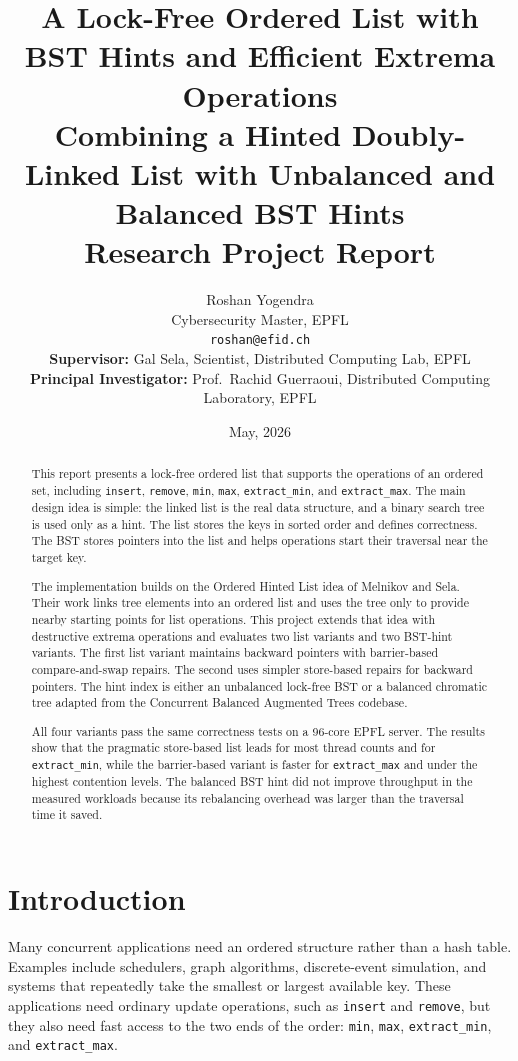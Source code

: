 \documentclass[a4paper,11pt]{article}
\title{\vspace{-1.0cm}\textbf{A Lock-Free Ordered List with BST Hints and Efficient Extrema Operations}\\[0.35em]
\large Combining a Hinted Doubly-Linked List with Unbalanced and Balanced BST Hints\\[0.35em]
\normalsize Research Project Report}
\author{
  Roshan Yogendra\\
  \small Cybersecurity Master, EPFL\\
  \small \texttt{roshan@efid.ch}\\[0.8em]
  \small \textbf{Supervisor:} Gal Sela, Scientist, Distributed Computing Lab, EPFL\\[0.3em]
  \small \textbf{Principal Investigator:} Prof.\ Rachid Guerraoui,
         Distributed Computing Laboratory, EPFL\\[0.8em]
}
\date{May, 2026}
\newcommand{\code}[1]{\texttt{#1}}
\begin{document}
\maketitle

\begin{abstract}
This report presents a lock-free ordered list that supports the operations of an ordered set, including \code{insert}, \code{remove}, \code{min}, \code{max}, \code{extract\_min}, and \code{extract\_max}. The main design idea is simple: the linked list is the real data structure, and a binary search tree is used only as a hint. The list stores the keys in sorted order and defines correctness. The BST stores pointers into the list and helps operations start their traversal near the target key.

The implementation builds on the Ordered Hinted List idea of Melnikov and Sela. Their work links tree elements into an ordered list and uses the tree only to provide nearby starting points for list operations. This project extends that idea with destructive extrema operations and evaluates two list variants and two BST-hint variants. The first list variant maintains backward pointers with barrier-based compare-and-swap repairs. The second uses simpler store-based repairs for backward pointers. The hint index is either an unbalanced lock-free BST or a balanced chromatic tree adapted from the Concurrent Balanced Augmented Trees codebase.

All four variants pass the same correctness tests on a 96-core EPFL server. The results show that the pragmatic store-based list leads for most thread counts and for \code{extract\_min}, while the barrier-based variant is faster for \code{extract\_max} and under the highest contention levels. The balanced BST hint did not improve throughput in the measured workloads because its rebalancing overhead was larger than the traversal time it saved.
\end{abstract}

\newpage
\tableofcontents
\newpage

\section{Introduction}

Many concurrent applications need an ordered structure rather than a hash table. Examples include schedulers, graph algorithms, discrete-event simulation, and systems that repeatedly take the smallest or largest available key. These applications need ordinary update operations, such as \code{insert} and \code{remove}, but they also need fast access to the two ends of the order: \code{min}, \code{max}, \code{extract\_min}, and \code{extract\_max}.
\end{document}

